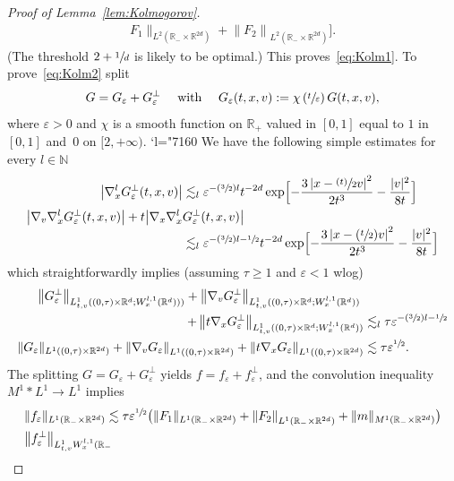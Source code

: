 \documentclass[10pt]{amsart}
\newcommand{\Psfrac}[2]{(\sfrac{#1}{#2})}
\newcommand{\psfrac}[2]{\sfrac{(#1)}{#2}}
\newcommand{\Changel}{\mathcode`l="7160}
\theoremstyle{definition}
\theoremstyle{remark}
\newcommand\R{{\mathbb R}}
\let\var\varepsilon
\begin{document}
\begin{proof}[Proof of Lemma~\ref{lem:Kolmogorov}]
\begin{multline*}
F_1 \|_{L^2(\R_- \times \R^{2d})} + \left\| F_2
\right\|_{L^2(\R_- \times \R^{2d})} \bigr].
\end{multline*}
(The threshold $2+\sfrac1d$ is likely to be optimal.) This
proves~\eqref{eq:Kolm1}. To prove~\eqref{eq:Kolm2} split
\begin{align*}
G = G_\var + G_\var^\bot \quad \text{ with } \quad
G_\var(t,x,v) := \chi \left( \sfrac{t}{\var} \right) G(t,x,v),
\end{align*}
where $\var >0$ and $\chi$ is a smooth function on $\R_+$
valued in $[0,1]$ equal to $1$ in $[0,1]$ and~$0$ on
$[2,+\infty)$.
\Changel
We have the following simple estimates for every
$l \in \mathbb{N}$
\begin{align*}
\left|\nabla_x^l G_\var^\bot(t,x,v)\right| &\lesssim_l
\var^{-\Psfrac32 l}t^{-2d}
\exp \Bigl[ - \frac{3 \left| x - \psfrac{t}{2} v
\right|^2}{2t^3} - \frac{|v|^2}{8t} \Bigr] \\
 \left|\nabla_v \nabla_x^l G_\var^\bot(t,x,v)\right|
+ t\bigl|\nabla_x \nabla_x^l &G_\var^\bot(t,x,v) \bigr|
\\[-3pt]
&\lesssim_l \var^{-\Psfrac32 l -\sfrac12} t^{-2d}
\exp \Bigl[ - \frac{3 \left| x - \Psfrac{t}{2} v
\right|^2}{2t^3} - \frac{|v|^2}{8t} \Bigr]
\end{align*}
which straightforwardly implies (assuming $\tau \ge 1$ and
$\var <1$ wlog)
\begin{align*}
\left\| G_\var^\bot \right\|_{L^1_{t,v}((0,\tau)
\times \R^d; W^{l,1}_x(\R^d)))} +
\left\| \nabla_v G_\var^\bot \right\|_{L^1_{t,v}((0,\tau)
\times \R^d ; W^{l,1}_x(\R^d))}\hspace*{1mm}& \\
+ \left\|t\nabla_x G_\var^\bot \right\|_{L^1_{t,v}((0,\tau)
\times \R^d ; W^{l,1}_x(\R^d))}
&\lesssim_l \tau \var^{-\Psfrac32 l -\sfrac12} \\
\| G_\var \|_{L^1((0,\tau) \times \R^{2d})} + \left\|
\nabla_v G_\var \right\|_{L^1((0,\tau) \times \R^{2d})}
+ \left\|t\nabla_x G_\var \right\|_{L^1((0,\tau) \times \R^{2d})}
&\lesssim \tau \var^{\sfrac12}.
\end{align*}
The splitting $G=G_\var + G_\var^\bot$ yields
$f = f_\var + f_\var^\bot$, and the convolution inequality
$M^1 * L^1 \to L^1$ implies
\begin{align*}
& \| f_\var \|_{L^1(\R_- \times \R^{2d})} \lesssim
\tau \var^{\sfrac12} \bigl( \| F_1 \|_{L^1(\R_- \times \R^{2d})} +
\left\| F_2 \right\|_{L^1(\R_- \times \R^{2d})}
+ \| m \|_{M^1(\R_- \times
\R^{2d})} \bigr) \\
& \bigl\| f_\var^\bot \bigr\|_{L^1_{t,v}W^{l,1}_x(\R_-
}
\end{align*}
\end{proof}
\end{document}
